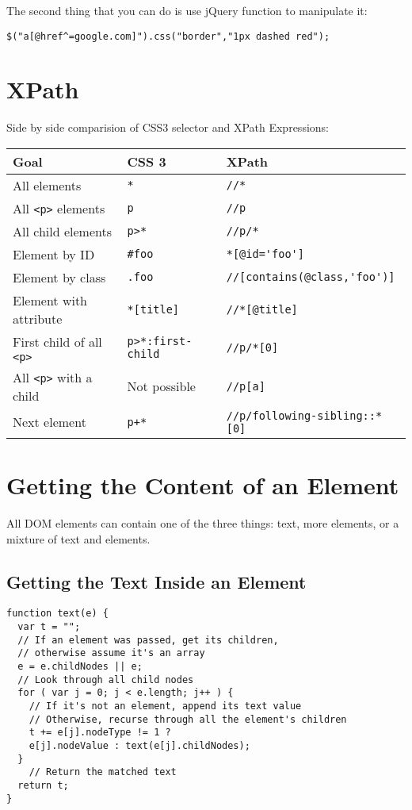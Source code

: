 \documentclass[a4paper,11pt]{book}
\begin{document}
The second thing that you can do is use jQuery function to manipulate it:
\begin{verbatim}
$("a[@href^=google.com]").css("border","1px dashed red");
\end{verbatim}
\section{XPath}
Side by side comparision of CSS3 selector and XPath Expressions:

\begin{tabular}{l l l}
\hline
\textbf{Goal} & \textbf{CSS 3} & \textbf{XPath} \\
\hline
All elements & \verb|*| &\verb|//*|  \\
All \verb|<p>| elements & \verb|p| & \verb|//p| \\
All child elements & \verb|p>*| & \verb|//p/*|\\ 
Element by ID & \verb|#foo| & \verb|*[@id='foo']| \\
Element by class & \verb|.foo| & \verb|//[contains(@class,'foo')]|\\
Element with attribute & \verb|*[title]| & \verb|//*[@title]|\\
First child of all \verb|<p>| & \verb|p>*:first-child| & \verb|//p/*[0]| \\
All \verb|<p>| with a child & Not possible & \verb|//p[a]|\\
Next element & \verb|p+*| & \verb|//p/following-sibling::*[0]|\\
\hline
\end{tabular}
\section{Getting the Content of an Element}
All DOM elements can contain one of the three things: text, more elements, or a
mixture of text and elements.
\subsection{Getting the Text Inside an Element}
\begin{verbatim}
function text(e) {
  var t = "";
  // If an element was passed, get its children,
  // otherwise assume it's an array
  e = e.childNodes || e;
  // Look through all child nodes
  for ( var j = 0; j < e.length; j++ ) {
    // If it's not an element, append its text value
    // Otherwise, recurse through all the element's children
    t += e[j].nodeType != 1 ?
    e[j].nodeValue : text(e[j].childNodes);
  }
    // Return the matched text
  return t;
}
\end{verbatim}
\end{document}
